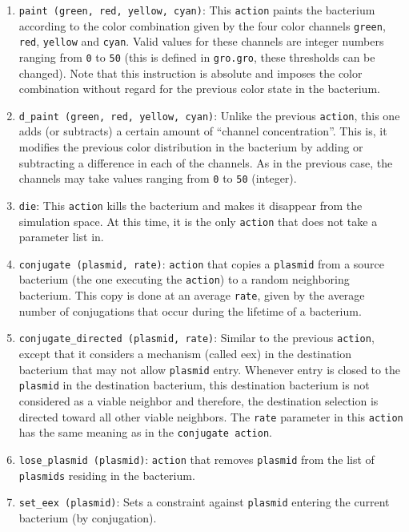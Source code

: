 \documentclass[10pt,a4paper]{article}
\begin{document}
\begin{enumerate}
	\item \texttt{paint (green, red, yellow, cyan)}: This \texttt{action} paints the bacterium according to the color combination given by the four color channels \texttt{green}, \texttt{red}, \texttt{yellow} and \texttt{cyan}. Valid values for these channels are integer numbers ranging from \texttt{0} to \texttt{50} (this is defined in \texttt{gro.gro}, these thresholds can be changed). Note that this instruction is absolute and imposes the color combination without regard for the previous color state in the bacterium.
	\item \texttt{d\_paint (green, red, yellow, cyan)}: Unlike the previous \texttt{action}, this one adds (or subtracts) a certain amount of “channel concentration”. This is, it modifies the previous color distribution in the bacterium by adding or subtracting a difference in each of the channels. As in the previous case, the channels may take values ranging from \texttt{0} to \texttt{50} (integer).
	\item \texttt{die}: This \texttt{action} kills the bacterium and makes it disappear from the simulation space. At this time, it is the only \texttt{action} that does not take a parameter list in.
	\item \texttt{conjugate (plasmid, rate)}: \texttt{action} that copies a \texttt{plasmid} from a source bacterium (the one executing the \texttt{action}) to a random neighboring bacterium. This copy is done at an average \texttt{rate}, given by the average number of conjugations that occur during the lifetime of a bacterium.
	\item \texttt{conjugate\_directed (plasmid, rate)}: Similar to the previous \texttt{action}, except that it considers a mechanism (called eex) in the destination bacterium that may not allow \texttt{plasmid} entry. Whenever entry is closed to the \texttt{plasmid} in the destination bacterium, this destination bacterium is not considered as a viable neighbor and therefore, the destination selection is directed toward all other viable neighbors. The \texttt{rate} parameter in this \texttt{action} has the same meaning as in the \texttt{conjugate action}.
	\item \texttt{lose\_plasmid (plasmid)}:  \texttt{action} that removes \texttt{plasmid} from the list of \texttt{plasmids} residing in the bacterium.
	\item \texttt{set\_eex (plasmid)}: Sets a constraint against \texttt{plasmid} entering the current bacterium (by conjugation).

\end{enumerate}
\end{document}
